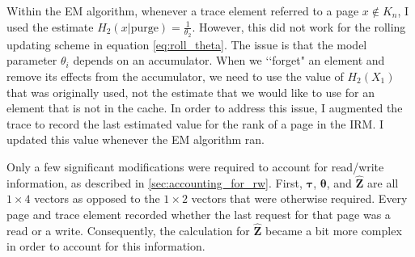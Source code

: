   Within the EM algorithm, whenever a trace element referred to a page $x \not\in
  K_n$, I used the estimate $H_2(x| \mbox{purge}) = \frac{1}{\theta_2}$.
  However, this did not work for the rolling updating scheme in equation
  \ref{eq:roll_theta}. The issue is that the model parameter $\theta_i$ depends
  on an accumulator. When we \lq\lq forget" an element and remove its effects
  from the accumulator, we need to use the value of $H_2(X_1)$ that was
  originally used, not the estimate that we would like to use for an element
  that is not in the cache. In order to address this issue, I augmented the
  trace to record the last estimated value for the rank of a page in the IRM. I
  updated this value whenever the EM algorithm ran.

  Only a few significant modifications were required to account for read/write
  information, as described in \ref{sec:accounting_for_rw}. First, $\bm{\tau}$,
  $\bm{\theta}$, and $\hat{\bm{Z}}$ are all $1 \times 4$ vectors as opposed to
  the $1 \times 2$ vectors that were otherwise required. Every page and trace
  element recorded whether the last request for that page was a read or a write.
  Consequently, the calculation for $\hat{\bm{Z}}$ became a bit more complex in
  order to account for this information.

